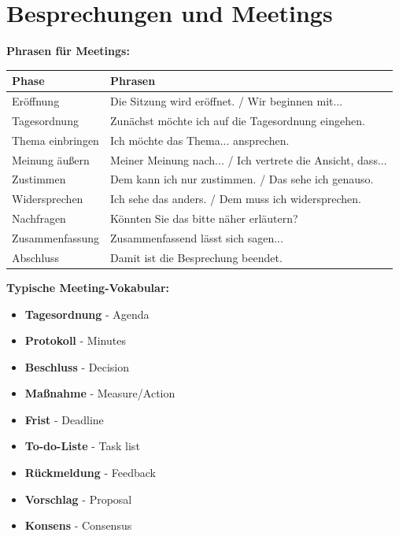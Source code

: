 \section{Besprechungen und Meetings}
\label{sec:Besprechungen}

\bigskip
\noindent\textbf{Phrasen für Meetings:}

\begin{center}
\begin{tabular}{|l|p{8cm}|}
\hline
Phase & Phrasen \\ \hline
Eröffnung & Die Sitzung wird eröffnet. / Wir beginnen mit... \\ \hline
Tagesordnung & Zunächst möchte ich auf die Tagesordnung eingehen. \\ \hline
Thema einbringen & Ich möchte das Thema... ansprechen. \\ \hline
Meinung äußern & Meiner Meinung nach... / Ich vertrete die Ansicht, dass... \\ \hline
Zustimmen & Dem kann ich nur zustimmen. / Das sehe ich genauso. \\ \hline
Widersprechen & Ich sehe das anders. / Dem muss ich widersprechen. \\ \hline
Nachfragen & Könnten Sie das bitte näher erläutern? \\ \hline
Zusammenfassung & Zusammenfassend lässt sich sagen... \\ \hline
Abschluss & Damit ist die Besprechung beendet. \\ \hline
\end{tabular}
\end{center}

\bigskip
\noindent\textbf{Typische Meeting-Vokabular:}

\begin{itemize}
    \item \textbf{Tagesordnung} - Agenda
    \item \textbf{Protokoll} - Minutes
    \item \textbf{Beschluss} - Decision
    \item \textbf{Maßnahme} - Measure/Action
    \item \textbf{Frist} - Deadline
    \item \textbf{To-do-Liste} - Task list
    \item \textbf{Rückmeldung} - Feedback
    \item \textbf{Vorschlag} - Proposal
    \item \textbf{Konsens} - Consensus
\end{itemize}

